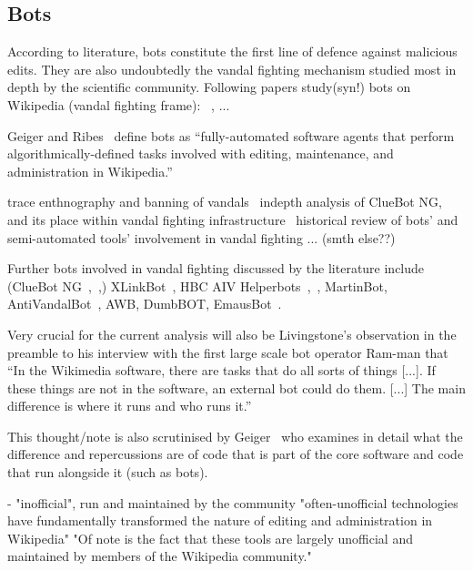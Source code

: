 \subsection{Bots}

According to literature, bots constitute the first line of defence against malicious edits. %
They are also undoubtedly the vandal fighting mechanism studied most in depth by the scientific community.
Following papers study(syn!) bots on Wikipedia (vandal fighting frame):
~\cite{GeiRib2010},
...

Geiger and Ribes~\cite{GeiRib2010} define bots as
``fully-automated software
agents that perform algorithmically-defined tasks involved
with editing, maintenance, and administration in Wikipedia.''

trace enthnography and banning of vandals~\cite{GeiRib2010}
indepth analysis of ClueBot NG, and its place within vandal fighting infrastructure~\cite{GeiHal2013}
historical review of bots' and semi-automated tools' involvement in vandal fighting\cite{HalRied2012}
... (smth else??)

Further bots involved in vandal fighting discussed by the literature include (ClueBot NG~\cite{GeiHal2013},~\cite{HalRied2012},)
XLinkBot~\cite{HalRied2012},
HBC AIV Helperbots~\cite{HalRied2012},~\cite{GeiRib2010},
MartinBot, AntiVandalBot~\cite{HalRied2012},
AWB, DumbBOT, EmausBot~\cite{GeiHal2013}.

Very crucial for the current analysis will also be Livingstone's observation in the preamble to his interview with the first large scale bot operator Ram-man that
``In the Wikimedia software, there are tasks that do all sorts of things [...].
If these things are not in the software, an external bot could do them. [...]
The main difference is where it runs and who runs it.''~\cite{Livingstone2016}

This thought/note is also scrutinised by Geiger~\cite{Geiger2014} who examines in detail what the difference and repercussions are of code that is part of the core software and code that run alongside it (such as bots). %

- "inofficial", run and maintained by the community
    \cite{GeiRib2010}
    "often-unofficial technologies have fundamentally
    transformed the nature of editing and administration in
    Wikipedia"
    "Of note is the fact that these tools are largely
    unofficial and maintained by members of the Wikipedia
    community."

